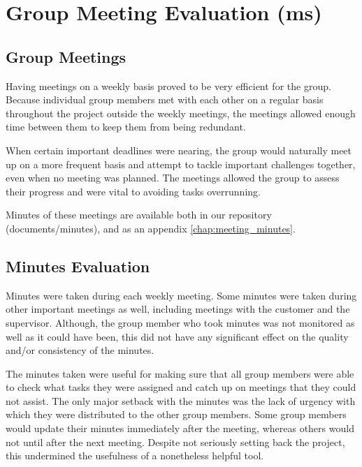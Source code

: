 \section{Group Meeting Evaluation (ms)}
\label{evaluation meeting}

\subsection{Group Meetings}

Having meetings on a weekly basis proved to be very efficient
for the group. Because individual group members met with 
each other on a regular basis throughout the project outside
the weekly meetings, the meetings allowed enough time 
between them to keep them from being redundant.

When certain important deadlines were nearing, the group
would naturally meet up on a more frequent basis and
attempt to tackle important challenges together, even when
no meeting was planned. The meetings allowed the group 
to assess their progress and were vital to avoiding tasks
overrunning.

Minutes of these meetings are available both in our repository \cite{github} 
(documents/minutes), and as an appendix \ref{chap:meeting_minutes}.

\subsection{Minutes Evaluation}

Minutes were taken during each weekly meeting. 
Some minutes were taken during other important meetings 
as well, including meetings with the customer and the 
supervisor. Although, the group member who took 
minutes was not monitored as well as it could have been, 
this did not have any significant effect on the quality 
and/or consistency of the minutes.

The minutes taken were useful for making sure that
all group members were able to check what tasks
they were assigned and catch up on meetings that they
could not assist. The only major setback with the minutes
was the lack of urgency with which they were distributed
to the other group members. Some group members would
update their minutes immediately after the meeting, whereas 
others would not until after the next meeting. Despite
not seriously setting back the project, this undermined the
usefulness of a nonetheless helpful tool.
